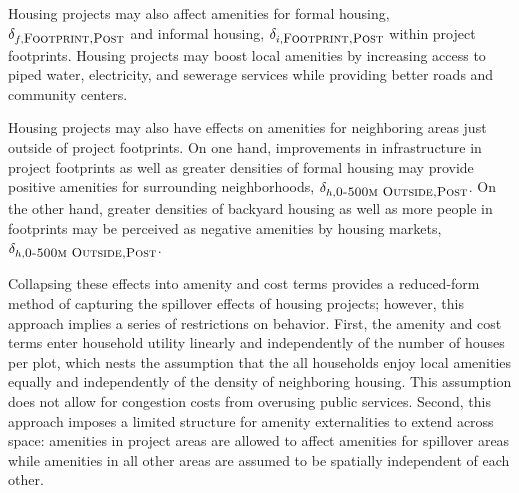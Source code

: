 \documentclass[12pt]{article}
\begin{document}
Housing projects may also affect amenities for formal housing, $\delta_{f,\textsc{\small Footprint,Post}}$ and informal housing, $\delta_{i,\textsc{\small Footprint,Post}}$ within project footprints.  Housing projects may boost local amenities by increasing access to piped water, electricity, and sewerage services while providing better roads and community centers.  

Housing projects may also have effects on amenities for neighboring areas just outside of project footprints.  On one hand, improvements in infrastructure in project footprints as well as greater densities of formal housing may provide positive amenities for surrounding neighborhoods, $\delta_{h,\textsc{\small 0-500m Outside,Post}}$.  On the other hand, greater densities of backyard housing as well as more people in footprints may be perceived as negative amenities by housing markets, $\delta_{h,\textsc{\small 0-500m Outside,Post}}$.  

Collapsing these effects into amenity and cost terms provides a reduced-form method of capturing the spillover effects of housing projects; however, this approach implies a series of restrictions on behavior.  First, the amenity and cost terms enter household utility linearly and independently of the number of houses per plot, which nests the assumption that the all households enjoy local amenities equally and independently of the density of neighboring housing.  This assumption does not allow for congestion costs from overusing public services.  Second, this approach imposes a limited structure for amenity externalities to extend across space:  amenities in project areas are allowed to affect amenities for spillover areas while amenities in all other areas are assumed to be spatially independent of each other.  






\end{document}
